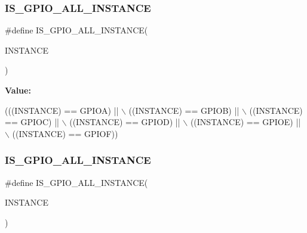 \subsubsection{\texorpdfstring{I\+S\+\_\+\+G\+P\+I\+O\+\_\+\+A\+L\+L\+\_\+\+I\+N\+S\+T\+A\+N\+CE}{IS\_GPIO\_ALL\_INSTANCE}\hspace{0.1cm}{\footnotesize\ttfamily [15/16]}}
{\footnotesize\ttfamily \#define I\+S\+\_\+\+G\+P\+I\+O\+\_\+\+A\+L\+L\+\_\+\+I\+N\+S\+T\+A\+N\+CE(\begin{DoxyParamCaption}\item[{}]{I\+N\+S\+T\+A\+N\+CE }\end{DoxyParamCaption})}

{\bfseries Value\+:}
\begin{DoxyCode}
(((INSTANCE) == GPIOA) || \(\backslash\)
                                         ((INSTANCE) == GPIOB) || \(\backslash\)
                                         ((INSTANCE) == GPIOC) || \(\backslash\)
                                         ((INSTANCE) == GPIOD) || \(\backslash\)
                                         ((INSTANCE) == GPIOE) || \(\backslash\)
                                         ((INSTANCE) == GPIOF))
\end{DoxyCode}
\mbox{\label{group___exported__macro_ga783626dd2431afebea836a102e318957}} 
\subsubsection{\texorpdfstring{I\+S\+\_\+\+G\+P\+I\+O\+\_\+\+A\+L\+L\+\_\+\+I\+N\+S\+T\+A\+N\+CE}{IS\_GPIO\_ALL\_INSTANCE}\hspace{0.1cm}{\footnotesize\ttfamily [16/16]}}
{\footnotesize\ttfamily \#define I\+S\+\_\+\+G\+P\+I\+O\+\_\+\+A\+L\+L\+\_\+\+I\+N\+S\+T\+A\+N\+CE(\begin{DoxyParamCaption}\item[{}]{I\+N\+S\+T\+A\+N\+CE }\end{DoxyParamCaption})}


